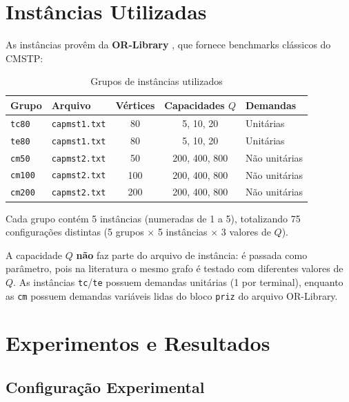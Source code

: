 \documentclass[12pt, a4paper]{article}
\begin{document}
\section{Instâncias Utilizadas}

As instâncias provêm da \textbf{OR-Library} \cite{beasley1990}, que fornece benchmarks clássicos do CMSTP:

\begin{table}[H]
\centering
\caption{Grupos de instâncias utilizados}
\begin{tabular}{llccl}
\toprule
\textbf{Grupo} & \textbf{Arquivo} & \textbf{Vértices} & \textbf{Capacidades $Q$} & \textbf{Demandas} \\
\midrule
\texttt{tc80} & \texttt{capmst1.txt} & 80 & 5, 10, 20 & Unitárias \\
\texttt{te80} & \texttt{capmst1.txt} & 80 & 5, 10, 20 & Unitárias \\
\texttt{cm50} & \texttt{capmst2.txt} & 50 & 200, 400, 800 & Não unitárias \\
\texttt{cm100} & \texttt{capmst2.txt} & 100 & 200, 400, 800 & Não unitárias \\
\texttt{cm200} & \texttt{capmst2.txt} & 200 & 200, 400, 800 & Não unitárias \\
\bottomrule
\end{tabular}
\end{table}

Cada grupo contém 5 instâncias (numeradas de 1 a 5), totalizando 75 configurações distintas (5 grupos $\times$ 5 instâncias $\times$ 3 valores de $Q$).

A capacidade $Q$ \textbf{não} faz parte do arquivo de instância: é passada como parâmetro, pois na literatura o mesmo grafo é testado com diferentes valores de $Q$. As instâncias \texttt{tc}/\texttt{te} possuem demandas unitárias (1 por terminal), enquanto as \texttt{cm} possuem demandas variáveis lidas do bloco \texttt{priz} do arquivo OR-Library.

\section{Experimentos e Resultados}

\subsection{Configuração Experimental}
\end{document}
